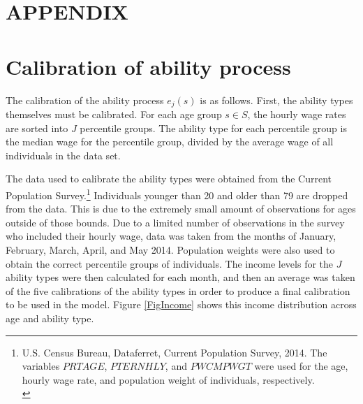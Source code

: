 \documentclass[letterpaper,12pt]{article}
\theoremstyle{definition}
\begin{document}
\newpage
\renewcommand{\theequation}{A.\arabic{section}.\arabic{equation}}
\renewcommand{\thesection}{A-\arabic{section}}   %
\setcounter{equation}{0}                         %
\setcounter{section}{0}                          %
\section*{APPENDIX}                              %

\section{Calibration of ability process}\label{AppAbilCalib}

  The calibration of the ability process $e_j(s)$ is as follows.  First, the ability types themselves must be calibrated. For each age group $s \in S$, the hourly wage rates are sorted into $J$ percentile groups.  The ability type for each percentile group is the median wage for the percentile group, divided by the average wage of all individuals in the data set.

  The data used to calibrate the ability types were obtained from the Current Population Survey.\footnote{U.S. Census Bureau, Dataferret, Current Population Survey, 2014. The variables $PRTAGE$, $PTERNHLY$, and $PWCMPWGT$ were used for the age, hourly wage rate, and population weight of individuals, respectively. \\ [-2pt]} Individuals younger than 20 and older than 79 are dropped from the data. This is due to the extremely small amount of observations for ages outside of those bounds. Due to a limited number of observations in the survey who included their hourly wage, data was taken from the months of January, February, March, April, and May 2014.  Population weights were also used to obtain the correct percentile groups of individuals.  The income levels for the $J$ ability types were then calculated for each month, and then an average was taken of the five calibrations of the ability types in order to produce a final calibration to be used in the model. Figure \ref{FigIncome} shows this income distribution across age and ability type.
\end{document}
